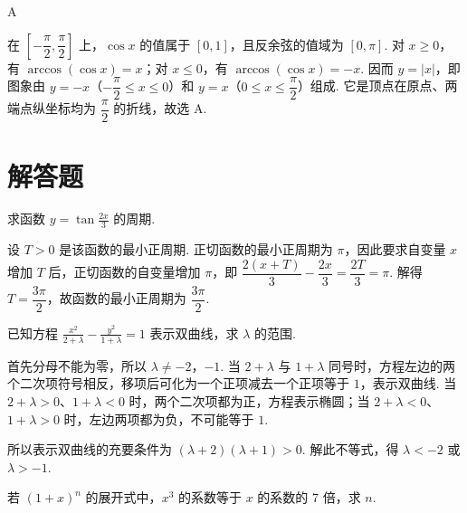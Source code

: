 \begin{answer}
A
\end{answer}

\begin{solution}
在 \(\left[-\dfrac{\pi}{2},\dfrac{\pi}{2}\right]\) 上，\(\cos x\) 的值属于 \([0,1]\)，且反余弦的值域为 \([0,\pi]\). 对 \(x\geqslant0\)，有 \(\arccos(\cos x)=x\)；对 \(x\leqslant0\)，有 \(\arccos(\cos x)=-x\). 因而
\(y=\left|x\right|\)，即图象由 \(y=-x\)（\(-\dfrac{\pi}{2}\leq x\leqslant0\)）和 \(y=x\)（\(0\leq x\leq\dfrac{\pi}{2}\)）组成. 它是顶点在原点、两端点纵坐标均为 \(\dfrac{\pi}{2}\) 的折线，故选 A.
\end{solution}

\section{解答题}

\begin{problem}

求函数 \(y = \tan \frac{2x}{3}\) 的周期.
\end{problem}

\begin{solution}
设 \(T>0\) 是该函数的最小正周期. 正切函数的最小正周期为 \(\pi\)，因此要求自变量 \(x\) 增加 \(T\) 后，正切函数的自变量增加 \(\pi\)，即
\(\dfrac{2(x+T)}{3}-\dfrac{2x}{3}=\dfrac{2T}{3}=\pi\). 解得 \(T=\dfrac{3\pi}{2}\)，故函数的最小正周期为 \(\dfrac{3\pi}{2}\).
\end{solution}

\begin{problem}

已知方程 \(\frac{x^2}{2 + \lambda} - \frac{y^2}{1 + \lambda} = 1\) 表示双曲线，求 \(\lambda\) 的范围.
\end{problem}

\begin{solution}
首先分母不能为零，所以 \(\lambda\ne-2\)，\(-1\). 当 \(2+\lambda\) 与 \(1+\lambda\) 同号时，方程左边的两个二次项符号相反，移项后可化为一个正项减去一个正项等于 \(1\)，表示双曲线. 当 \(2+\lambda>0\)、\(1+\lambda<0\) 时，两个二次项都为正，方程表示椭圆；当 \(2+\lambda<0\)、\(1+\lambda>0\) 时，左边两项都为负，不可能等于 \(1\).

所以表示双曲线的充要条件为
\((\lambda+2)(\lambda+1)>0\). 解此不等式，得 \(\lambda<-2\) 或 \(\lambda>-1\).
\end{solution}

\begin{problem}

若 \(\left(1 + x\right)^n\) 的展开式中，\(x^3\) 的系数等于 \(x\) 的系数的 7 倍，求 \(n\).
\end{problem}

